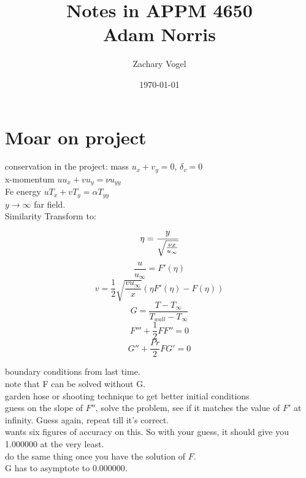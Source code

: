 \documentclass{article}
\begin{document}
\author{Zachary Vogel}
\date{\today}
\title{Notes in APPM 4650\\Adam Norris}

\maketitle



\section{Moar on project}
conservation in the project:
mass $u_x+v_y=0$, $\delta_v=0$\\
x-momentum $uu_x+vu_y=\nu u_{yy}$\\
Fe energy $uT_x+vT_y=\alpha T_{yy}$\\
$y\to\infty$ far field.\\
Similarity Transform to:\\
\[\eta=\cfrac{y}{\sqrt{\frac{\nu x}{u_\infty}}}\]
\[\frac{u}{u_\infty}=F'(\eta)\]
\[v=\frac{1}{2}\sqrt{\frac{vu_\infty}{x}}(\eta F'(\eta)-F(\eta))\]
\[G=\frac{T-T_\infty}{T_{wall}-T_\infty}\]
\[F'''+\frac{1}{2}FF''=0\]
\[G''+\frac{Pr}{2}FG'=0\]

boundary conditions from last time.\\
note that F can be solved without G.\\
garden hose or shooting technique to get better initial conditions\\
guess on the slope of $F''$, solve the problem, see if it matches the value of $F'$ at infinity. Guess again, repeat till it's correct.\\
wants six figures of accuracy on this. So with your guess, it should give you 1.000000 at the very least.\\

do the same thing once you have the solution of $F$.\\
G has to asymptote to $0.000000$.\\
\end{document}
